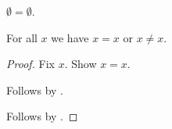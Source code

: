 \begin{axiom}\label{phase7_dependent_prefix}
    $\emptyset = \emptyset$.
\end{axiom}

\begin{proposition}\label{phase7_dependent_proof}
    For all $x$ we have $x = x$ or $x \neq x$.
\end{proposition}
\begin{proof}
    Fix $x$.
    Show $x = x$.
    \begin{subproof}
        Follows by \auto.
    \end{subproof}
    Follows by \auto.
\end{proof}
